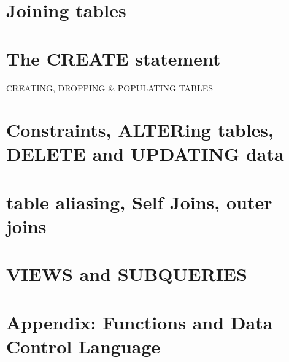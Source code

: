 \documentclass{article}
\begin{document}
\section{Joining tables}


\section{The CREATE statement}
CREATING, DROPPING \& POPULATING TABLES


\section{Constraints, ALTERing tables, DELETE and UPDATING data}


\section{table aliasing, Self Joins, outer joins}


\section{VIEWS and SUBQUERIES}


\section{Appendix: Functions and Data Control Language}

\end{document}
